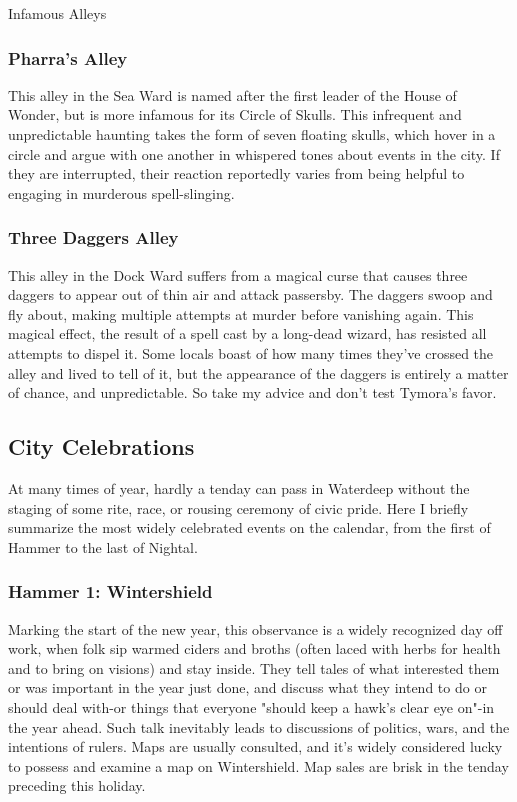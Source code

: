 \documentclass[10pt,a4paper,twoside,twocolumn,openany,nodeprecatedcode]{dndbook}
\begin{document}
\begin{DndComment}{Infamous Alleys}
\subsubsection{Pharra's Alley}
This alley in the Sea Ward is named after the first leader of the House of Wonder, but is more infamous for its Circle of Skulls. This infrequent and unpredictable haunting takes the form of seven floating skulls, which hover in a circle and argue with one another in whispered tones about events in the city. If they are interrupted, their reaction reportedly varies from being helpful to engaging in murderous spell-slinging.
\subsubsection{Three Daggers Alley}
This alley in the Dock Ward suffers from a magical curse that causes three daggers to appear out of thin air and attack passersby. The daggers swoop and fly about, making multiple attempts at murder before vanishing again. This magical effect, the result of a spell cast by a long-dead wizard, has resisted all attempts to dispel it. Some locals boast of how many times they've crossed the alley and lived to tell of it, but the appearance of the daggers is entirely a matter of chance, and unpredictable. So take my advice and don't test Tymora's favor.
\end{DndComment}

\subsection{City Celebrations}
At many times of year, hardly a tenday can pass in Waterdeep without the staging of some rite, race, or rousing ceremony of civic pride. Here I briefly summarize the most widely celebrated events on the calendar, from the first of Hammer to the last of Nightal.
\subsubsection{Hammer 1: Wintershield}
Marking the start of the new year, this observance is a widely recognized day off work, when folk sip warmed ciders and broths (often laced with herbs for health and to bring on visions) and stay inside. They tell tales of what interested them or was important in the year just done, and discuss what they intend to do or should deal with-or things that everyone "should keep a hawk's clear eye on"-in the year ahead.
Such talk inevitably leads to discussions of politics, wars, and the intentions of rulers. Maps are usually consulted, and it's widely considered lucky to possess and examine a map on Wintershield. Map sales are brisk in the tenday preceding this holiday.
\end{document}
